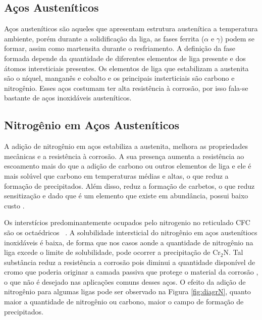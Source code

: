 \documentclass[]{politex}
\begin{document}
\subsection{Aços Austeníticos}
	Aços austeníticos são aqueles que apresentam estrutura austenítica a temperatura ambiente, porém durante a solidificação da liga, as fases ferrita ($\alpha$ e $\gamma$) podem se formar, assim como martensita durante o resfriamento. A definição da fase formada depende da quantidade de diferentes elementos de liga presente e dos átomos intersticiais presentes. Os elementos de liga que estabilizam a austenita são o níquel, manganês e cobalto e os principais insterticiais são carbono e nitrogênio.
	Esses aços costumam ter alta resistência à corrosão, por isso fala-se bastante de aços inoxidáveis austeníticos.

\subsection{Nitrogênio em Aços Austeníticos}
	A adição de nitrogênio em aços estabiliza a austenita, melhora as propriedades mecânicas e a resistência à corrosão. A sua presença aumenta a resistência ao escoamento mais do que a adição de carbono ou outros elementos de liga e ele é mais solúvel que carbono em temperaturas médias e altas, o que reduz a formação de precipitados. Além disso, reduz a formação de carbetos, o que reduz sensitização e dado que é um elemento que existe em abundância, possui baixo custo \cite{reed1989nitrogen}.\par
	Os interstícios predominantemente ocupados pelo nitrogenio no reticulado CFC são os octaédricos ~\cite{christiansen2006controlled}. A solubilidade intersticial do nitrogênio em aços austenítiocs inoxidáveis é baixa, de forma que nos casos aonde a quantidade de nitrogênio na liga excede o limite de solubilidade, pode ocorrer a precipitação de Cr$_{2}$N. Tal substância reduz a resistência a corrosão pois diminui a quantidade disponível de cromo que poderia originar a camada passiva que protege o material da corrosão \cite{somers2018expanded}, o que não é desejado nas aplicações comuns desses aços. O efeito da adição de nitrogênio para algumas ligas pode ser observado na Figura \ref{fig:diagrN}, quanto maior a quantidade de nitrogênio ou carbono, maior o campo de formação de precipitados.\par
\end{document}
